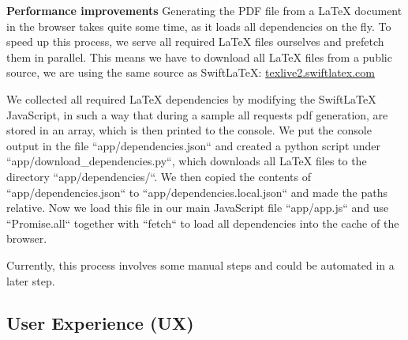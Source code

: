 \textbf{Performance improvements}
Generating the PDF file from a LaTeX document in the browser takes quite some time, as it loads all dependencies on the fly.
To speed up this process, we serve all required LaTeX files ourselves and prefetch them in parallel.
This means we have to download all LaTeX files from a public source, we are using the same source as SwiftLaTeX:
\href{https://texlive2.swiftlatex.com/}{texlive2.swiftlatex.com}

We collected all required LaTeX dependencies by modifying the SwiftLaTeX JavaScript, in such a way that during a sample
all requests pdf generation, are stored in an array, which is then printed to the console.
We put the console output in the file ``app/dependencies.json`` and created a python script under ``app/download\_dependencies.py``,
which downloads all LaTeX files to the directory ``app/dependencies/``.
We then copied the contents of ``app/dependencies.json`` to ``app/dependencies.local.json`` and made the paths relative.
Now we load this file in our main JavaScript file ``app/app.js`` and use ``Promise.all`` together with ``fetch`` to load
all dependencies into the cache of the browser.

Currently, this process involves some manual steps and could be automated in a later step.

\subsection{User Experience (UX)}\label{subsec:ux}
